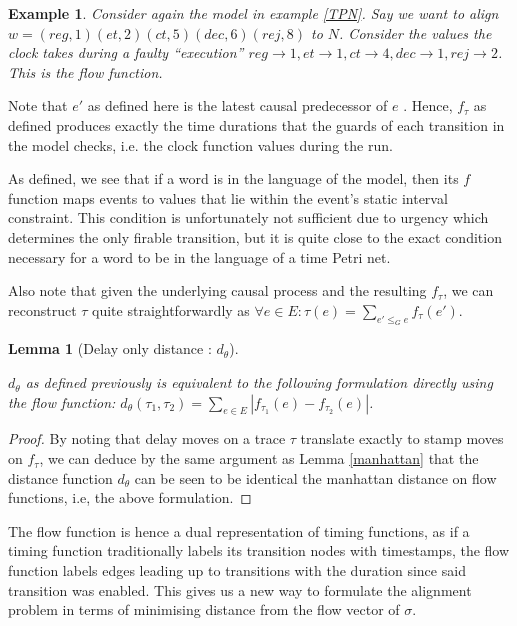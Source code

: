 \documentclass[conference]{IEEEtran}
\newtheorem{lemma}[theorem]{Lemma}
\newtheorem{example}{Example}
\begin{document}
\begin{example}\label{wordandflow}
	Consider again the model in example \ref{TPN}.
	Say we want to align  $w = (reg, 1)(et, 2)(ct, 5)(dec, 6)(rej, 8)$ to $N$.  
	Consider the values the clock takes during a faulty ``execution'' $reg \to 1, et \to 1, ct \to 4, dec \to 1, rej \to 2$. This is the flow function. 
\end{example}

Note that $e'$ as defined here is the latest causal predecessor of $e$
. 
Hence, $f_\tau$ as defined produces exactly the time durations that the guards of each transition in the model checks, i.e. the clock function values during the run. 

As defined, we see that if a word is in the language of the model, then its $f$ function maps events to values that lie within the event's static interval constraint.
This condition is unfortunately not sufficient due to urgency which determines the only firable transition, but it is quite close to the exact condition necessary for a word to be in the language of a time Petri net. 

Also note that given the underlying causal process and the resulting $f_\tau$, we can reconstruct $\tau$ quite straightforwardly as $\forall e \in E : \tau(e) = \sum_{e' \leq_G e} f_\tau(e')$.

\begin{lemma}[Delay only distance : $d_\theta$]\label{manhattan2}
	
	$d_\theta$ as defined previously is equivalent to the following formulation directly using the flow function:
	$d_\theta(\tau_1, \tau_2) = \sum_{e \in E}|f_{\tau_1}(e) - f_{\tau_2}(e)|$.
\end{lemma}	

\begin{proof}
	By noting that delay moves on a trace $\tau$ translate exactly to stamp moves on $f_\tau$, we can deduce by the same argument as Lemma \ref{manhattan} that the distance function $d_\theta$ can be seen to be identical the manhattan distance on flow functions, i.e, the above formulation. 
\end{proof}


The flow function is hence a dual representation of timing functions, as if a timing function traditionally labels its transition nodes with timestamps, the flow function labels edges leading up to transitions with the duration since said transition was enabled. This gives us a new way to formulate the alignment problem in terms of minimising distance from the flow vector of $\sigma$. 
\end{document}
